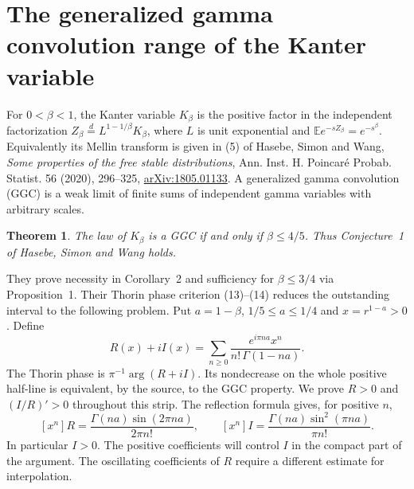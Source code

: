 \documentclass[11pt,a4paper]{article}
\newtheorem{theorem}{Theorem}[section]
\numberwithin{equation}{section}
\begin{document}
\section{The generalized gamma convolution range of the Kanter variable}
\label{sec:kanter}
For $0<\beta<1$, the Kanter variable $K_\beta$ is the positive
factor in the independent factorization $Z_\beta\stackrel{d}{=}
L^{1-1/\beta}K_\beta$, where $L$ is unit exponential and
$\mathbb Ee^{-sZ_\beta}=e^{-s^\beta}$. Equivalently its Mellin
transform is given in (5) of Hasebe, Simon and Wang, \emph{Some
properties of the free stable distributions}, Ann. Inst. H. Poincar\'e
Probab. Statist. 56 (2020), 296--325,
\href{https://arxiv.org/abs/1805.01133}{arXiv:1805.01133}.
A generalized gamma convolution (GGC) is a weak limit of finite sums
of independent gamma variables with arbitrary scales.
\begin{theorem}\label{th:kanter}
The law of $K_\beta$ is a GGC if and only if $\beta\le4/5$.
Thus Conjecture~1 of Hasebe, Simon and Wang holds.
\end{theorem}
They prove necessity in Corollary~2 and sufficiency for $\beta\le3/4$
via Proposition~1. Their Thorin phase criterion (13)--(14) reduces
the outstanding interval to the following problem. Put $a=1-\beta$,
$1/5\le a\le1/4$ and $x=r^{1-a}>0$. Define
\[
 R(x)+iI(x)=\sum_{n\ge0}
    \frac{e^{i\pi n a}x^n}{n!\,\Gamma(1-na)}.
\]
The Thorin phase is $\pi^{-1}\arg(R+iI)$. Its nondecrease on the whole
positive half-line is equivalent, by the source, to the GGC property.
We prove $R>0$ and $(I/R)'>0$ throughout this strip.
The reflection formula gives, for positive $n$,
\[
 [x^n]R=\frac{\Gamma(na)\sin(2\pi na)}{2\pi n!},\qquad
 [x^n]I=\frac{\Gamma(na)\sin^2(\pi na)}{\pi n!}.
\]
In particular $I>0$. The positive coefficients will control $I$ in
the compact part of the argument. The oscillating coefficients of
$R$ require a different estimate for interpolation.
\end{document}
